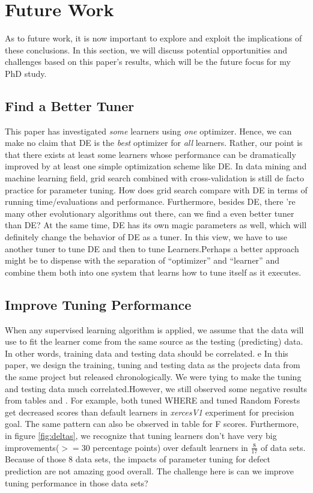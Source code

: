 \section{Future Work}

As to future work, it is now important
to explore and exploit the implications of these
conclusions. In this section, we will discuss potential opportunities and challenges 
based on this paper's results, which will be the future focus for my PhD study.

\subsection{Find a Better Tuner}

This paper has investigated  {\em some} learners using {\em one}  optimizer. Hence, we can make
no claim that DE is the {\em best} optimizer for {\em all} learners.
Rather, our point is that there exists at least some learners
whose performance can be dramatically improved by 
at least one simple optimization scheme like DE. In data mining and machine learning field,
grid search combined with cross-validation is still de facto practice for parameter tuning.
How does grid search compare with DE in terms of running time/evaluations and performance.
Furthermore, besides DE, there 're many other evolutionary algorithms out there, can we
find a even better tuner than DE? At the same time, DE has its own magic parameters as well, 
which will definitely change the behavior of DE as a tuner. In this view, we have
to use another tuner to tune DE and then to tune Learners.Perhaps a better approach might be
to dispense with the separation of ``optimizer'' and ``learner'' and combine them both
into one system that learns how to tune itself as it executes.

\subsection{Improve Tuning Performance}
When any supervised learning algorithm is applied, we assume that the data will use 
to fit the learner come from the same source as the testing (predicting) data. In other
words, training data and testing data should be correlated. 
e
In this paper, we
design the training, tuning and testing data as the projects data from the same project but
released chronologically. We were tying to make the tuning and testing data much
correlated.However,  we still observed some negative results from tables  and .
For example, both tuned WHERE and tuned Random Forests get decreased scores than default learners in {\it xercesV1}
experiment for precision goal. The same pattern can also be observed in table  for F scores.
Furthermore, in figure \ref{fig:deltas}, we recognize that tuning learners don't have very big
improvements($>= 30$ percentage points) over default learners in $\frac{8}{17}$ of data sets. Because of those 8 data sets,
the impacts of parameter tuning for defect prediction are not amazing good overall. The challenge here is
can we improve tuning performance in those data sets? 

